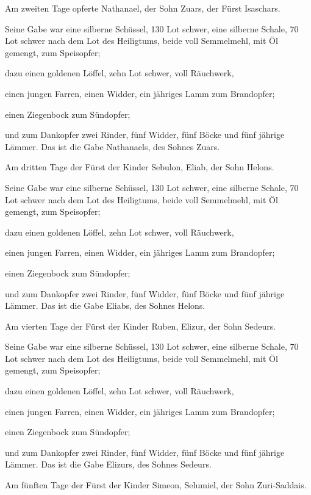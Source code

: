  Am zweiten Tage opferte Nathanael, der Sohn Zuars, der
Fürst Isaschars.

 Seine Gabe war eine silberne Schüssel, 130 Lot schwer,
eine silberne Schale, 70 Lot schwer nach dem Lot des Heiligtums, beide
voll Semmelmehl, mit Öl gemengt, zum Speisopfer;

 dazu einen goldenen Löffel, zehn Lot schwer, voll
Räuchwerk,

 einen jungen Farren, einen Widder, ein jähriges Lamm zum
Brandopfer;

 einen Ziegenbock zum Sündopfer;

 und zum Dankopfer zwei Rinder, fünf Widder, fünf Böcke und
fünf jährige Lämmer. Das ist die Gabe Nathanaels, des Sohnes Zuars.

 Am dritten Tage der Fürst der Kinder Sebulon, Eliab, der
Sohn Helons.

 Seine Gabe war eine silberne Schüssel, 130 Lot schwer,
eine silberne Schale, 70 Lot schwer nach dem Lot des Heiligtums, beide
voll Semmelmehl, mit Öl gemengt, zum Speisopfer;

 dazu einen goldenen Löffel, zehn Lot schwer, voll
Räuchwerk,

 einen jungen Farren, einen Widder, ein jähriges Lamm zum
Brandopfer;

 einen Ziegenbock zum Sündopfer;

 und zum Dankopfer zwei Rinder, fünf Widder, fünf Böcke und
fünf jährige Lämmer. Das ist die Gabe Eliabs, des Sohnes Helons.

 Am vierten Tage der Fürst der Kinder Ruben, Elizur, der
Sohn Sedeurs.

 Seine Gabe war eine silberne Schüssel, 130 Lot schwer,
eine silberne Schale, 70 Lot schwer nach dem Lot des Heiligtums, beide
voll Semmelmehl, mit Öl gemengt, zum Speisopfer;

 dazu einen goldenen Löffel, zehn Lot schwer, voll
Räuchwerk,

 einen jungen Farren, einen Widder, ein jähriges Lamm zum
Brandopfer;

 einen Ziegenbock zum Sündopfer;

 und zum Dankopfer zwei Rinder, fünf Widder, fünf Böcke und
fünf jährige Lämmer. Das ist die Gabe Elizurs, des Sohnes Sedeurs.

 Am fünften Tage der Fürst der Kinder Simeon, Selumiel, der
Sohn Zuri-Saddais.

